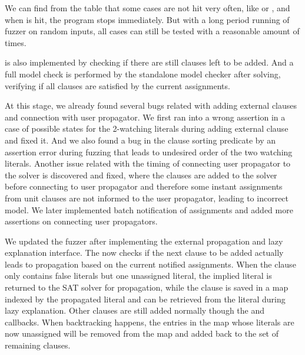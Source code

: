 We can find from the table that some cases are not hit very often, like  or , and when  is hit, the program stops immediately. But with a long period running of fuzzer on random inputs, all cases can still be tested with a reasonable amount of times.

 is also implemented by checking if there are still clauses left to be added. And a full model check is performed by the standalone model checker after solving, verifying if all clauses are satisfied by the current assignments.

At this stage, we already found several bugs related with adding external clauses and connection with user propagator. We first ran into a wrong assertion in a case of possible states for the 2-watching literals during adding external clause and fixed it. And we also found a bug in the clause sorting predicate by an assertion error during fuzzing that leads to undesired order of the two watching literals. Another issue related with the timing of connecting user propagator to the solver is discovered and fixed, where the clauses are added to the solver before connecting to user propagator and therefore some instant assignments from unit clauses are not informed to the user propagator, leading to incorrect model. We later implemented batch notification of assignments and added more assertions on connecting user propagators.

We updated the fuzzer after implementing the external propagation and lazy explanation interface. The  now checks if the next clause to be added actually leads to propagation based on the current notified assignments. When the clause only contains false literals but one unassigned literal, the implied literal is returned to the SAT solver for propagation, while the clause is saved in a map indexed by the propagated literal and can be retrieved from the literal during lazy explanation. Other clauses are still added normally though the  and  callbacks. When backtracking happens, the entries in the map whose literals are now unassigned will be removed from the map and added back to the set of remaining clauses.

